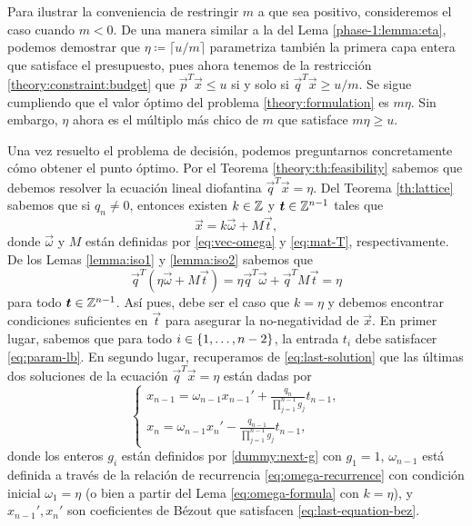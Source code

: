 \begin{observation}
	Para ilustrar la conveniencia de restringir $m$ a que sea positivo, consideremos el caso cuando
	$m < 0$. De una manera similar a la del Lema \ref{phase-1:lemma:eta}, podemos demostrar que
	$\eta \coloneq \lceil u/m \rceil$ parametriza también la primera capa entera que satisface el
	presupuesto, pues ahora tenemos de la restricción \eqref{theory:constraint:budget} que
	$\vec{p}^T\vec{x} \leq u$ si y solo si $\vec{q}^T\vec{x} \geq u/m$. Se sigue cumpliendo que el
	valor óptimo del problema \eqref{theory:formulation} es $m\eta$. Sin embargo, $\eta$ ahora es el
	múltiplo más chico de $m$ que satisface $m\eta \geq u$.
\end{observation}

Una vez resuelto el problema de decisión, podemos preguntarnos concretamente cómo obtener el punto
óptimo. Por el Teorema \ref{theory:th:feasibility} sabemos que debemos resolver la ecuación lineal
diofantina $\vec{q}^T\vec{x} = \eta$. Del Teorema \ref{th:lattice} sabemos que si $q_n \neq 0$,
entonces existen $k \in \mathbb{Z}$ y $\boldsymbol{t} \in \mathbb{Z}^{n-1}$ tales que
\begin{equation*}
	\vec{x} = k\vec{\omega} + M\vec{t},
\end{equation*}
donde $\vec{\omega}$ y $M$ están definidas por \eqref{eq:vec-omega} y \eqref{eq:mat-T},
respectivamente. De los Lemas \ref{lemma:iso1} y \ref{lemma:iso2} sabemos que
\begin{equation*}
	\vec{q}^T\left(\eta\vec{\omega} + M\vec{t}\right) = \eta\vec{q}^T\vec{\omega} + \vec{q}^TM\vec{t} = \eta
\end{equation*}
para todo $\boldsymbol{t} \in \mathbb{Z}^{n-1}$. Así pues, debe ser el caso que $k = \eta$ y debemos encontrar
condiciones suficientes en $\vec{t}$ para asegurar la no-negatividad de $\vec{x}$. En primer lugar,
sabemos que para todo $i \in \lbrace 1, \ldots, n - 2 \rbrace$, la entrada $t_i$ debe satisfacer
\eqref{eq:param-lb}. En segundo lugar, recuperamos de \eqref{eq:last-solution} que las últimas dos
soluciones de la ecuación $\vec{q}^T\vec{x} = \eta$ están dadas por
\begin{equation*}
	\begin{cases}
		x_{n-1} = \omega_{n-1}x_{n-1}' + \frac{q_n}{\prod_{j=1}^{n-1}g_j}t_{n-1}, \\
		x_n = \omega_{n-1}x_n' - \frac{q_{n-1}}{\prod_{j=1}^{n-1}g_j}t_{n-1},
	\end{cases}
\end{equation*}
donde los enteros $g_i$ están definidos por \eqref{dummy:next-g} con $g_1 = 1$, $\omega_{n-1}$ está
definida a través de la relación de recurrencia \eqref{eq:omega-recurrence} con condición inicial
$\omega_1 = \eta$ (o bien a partir del Lema \ref{eq:omega-formula} con $k = \eta$), y $x_{n-1}',
x_n'$ son coeficientes de Bézout que satisfacen \eqref{eq:last-equation-bez}.


